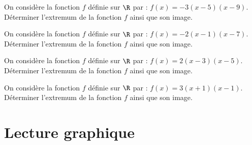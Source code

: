 \documentclass[11pt]{article}
\begin{document}
\begin{exercice}
  \begin{enu}
\item On considère la fonction $f$ définie sur $\R$ par : $f(x)=-3(x-5)(x-9)$.\\Déterminer l'extremum de la fonction $f$ ainsi que son image. 
	\item On considère la fonction $f$ définie sur $\R$ par : $f(x)=-2(x-1)(x-7)$.\\Déterminer l'extremum de la fonction $f$ ainsi que son image. 
	\item On considère la fonction $f$ définie sur $\R$ par : $f(x)=2(x-3)(x-5)$.\\Déterminer l'extremum de la fonction $f$ ainsi que son image. 
	\item On considère la fonction $f$ définie sur $\R$ par : $f(x)=3(x+1)(x-1)$.\\Déterminer l'extremum de la fonction $f$ ainsi que son image. 

  \end{enu}
\end{exercice}

\section{Lecture graphique}
\end{document}
